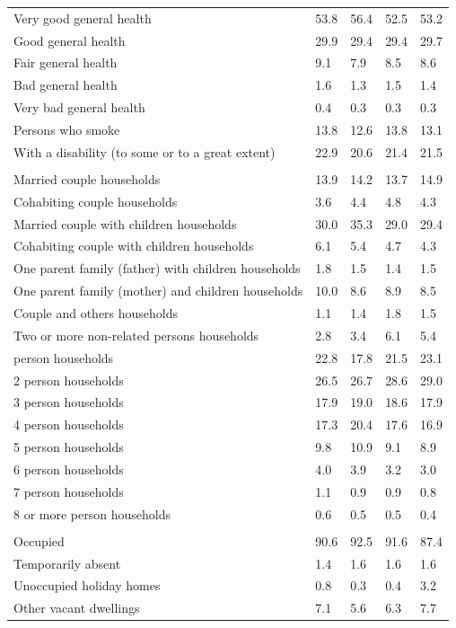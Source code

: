 \documentclass{article}
\begin{document}
\begin{table}[h]
\begin{tabular}{KTTTT}
    \hline
Very good general health & 53.8& 56.4&52.5& 53.2\\
Good general health & 29.9& 29.4& 29.4& 29.7\\
Fair general health & 9.1& 7.9&8.5& 8.6\\
Bad general health & 1.6& 1.3&1.5& 1.4\\
Very bad general health & 0.4& 0.3&0.3& 0.3\\
    \hline
Persons who smoke & 13.8& 12.6&13.8& 13.1\\
    \hline
With a disability (to some or to a great extent) & 22.9& 20.6&21.4& 21.5\\
\hline
    \\ 
    \hline
Married couple households & 13.9& 14.2& 13.7& 14.9\\
Cohabiting couple households & 3.6& 4.4& 4.8& 4.3\\
Married couple with children households & 30.0& 35.3& 29.0& 29.4\\
Cohabiting couple with children households & 6.1& 5.4& 4.7& 4.3\\
One parent family (father) with  children households & 1.8& 1.5& 1.4& 1.5\\
One parent family (mother) and children households & 10.0&  8.6&  8.9&  8.5\\
Couple and others households  & 1.1& 1.4& 1.8& 1.5\\
Two or more non-related persons households & 2.8& 3.4& 6.1& 5.4\\
     person households & 22.8& 17.8& 21.5& 23.1\\
2 person households & 26.5& 26.7& 28.6& 29.0\\
3 person households & 17.9& 19.0& 18.6& 17.9\\
4 person households & 17.3& 20.4& 17.6& 16.9\\
5 person households &  9.8& 10.9&  9.1&  8.9\\
6 person households & 4.0& 3.9& 3.2& 3.0\\
7 person households & 1.1& 0.9& 0.9& 0.8\\
8 or more person households & 0.6& 0.5& 0.5& 0.4\\
\hline
    \\ 
    \hline
Occupied & 90.6& 92.5& 91.6& 87.4\\
Temporarily absent & 1.4& 1.6& 1.6& 1.6\\
Unoccupied holiday homes & 0.8& 0.3& 0.4& 3.2\\
Other vacant dwellings & 7.1& 5.6& 6.3& 7.7\\
\hline
\end{tabular}
\end{table}
\end{document}
